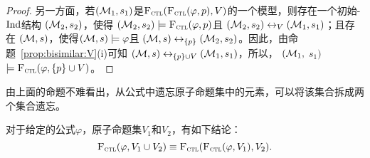 \begin{proof}
	另一方面，若$({\cal M}_1, s_1)$是${\textsc{F}_{\textsc{ctl}}}({\textsc{F}_{\textsc{ctl}}}(\varphi, p), V)$的一个模型，则存在一个初始-$\textrm{Ind}$结构 $({\cal M}_2, s_2)$，使得 $({\cal M}_2, s_2) \models {\textsc{F}_{\textsc{ctl}}}(\varphi, p)$且 $({\cal M}_2, s_2) \leftrightarrow_V ({\cal M}_1, s_1)$；且存在 $({\cal M}, s)$，使得$({\cal M}, s) \models \varphi$且 $({\cal M}, s) \leftrightarrow_{\{p\}} ({\cal M}_2, s_2)$。因此，由命题~\ref{prop:bisimilar:V}(i)可知 $({\cal M}, s) \leftrightarrow_{\{p\} \cup V} ({\cal M}_1, s_1)$，所以， $({\cal M}_1,$ $s_1)$ $\models {\textsc{F}_{\textsc{ctl}}}(\varphi, \{p\} \cup V)$。
\end{proof}

由上面的命题不难看出，从公式中遗忘原子命题集中的元素，可以将该集合拆成两个集合遗忘。
\begin{corollary}
	对于给定的公式$\varphi$，原子命题集$V_1$和$V_2$，有如下结论：
	\[
	{\textsc{F}_{\textsc{ctl}}}(\varphi,V_1\cup V_2) \equiv {\textsc{F}_{\textsc{ctl}}}({\textsc{F}_{\textsc{ctl}}}(\varphi,V_1),V_2).
	\]
\end{corollary}

